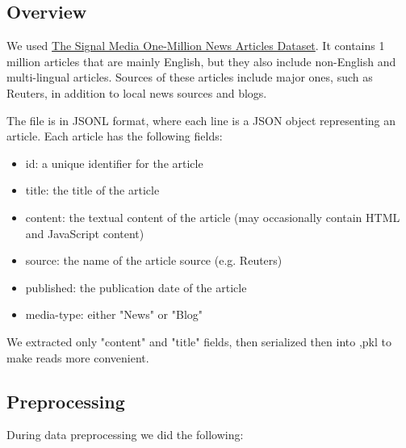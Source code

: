 \subsection{Overview}
We used \href{http://research.signalmedia.co/newsir16/signal-dataset.html}{The Signal Media One-Million News Articles Dataset}. It contains 1 million articles that are mainly English, but they also include non-English and multi-lingual articles. Sources of these articles include major ones, such as Reuters, in addition to local news sources and blogs.

The file is in JSONL format, where each line is a JSON object representing an article. Each article has the following fields:

\begin{itemize}
\item id: a unique identifier for the article
\item title: the title of the article
\item content: the textual content of the article (may occasionally contain HTML and JavaScript content)
\item source: the name of the article source (e.g. Reuters)
\item published: the publication date of the article
\item media-type: either "News" or "Blog"
\end{itemize}  

We extracted only "content" and "title" fields, then serialized then into ,pkl to make reads more convenient.

\subsection{Preprocessing}
During data preprocessing we did the following:

